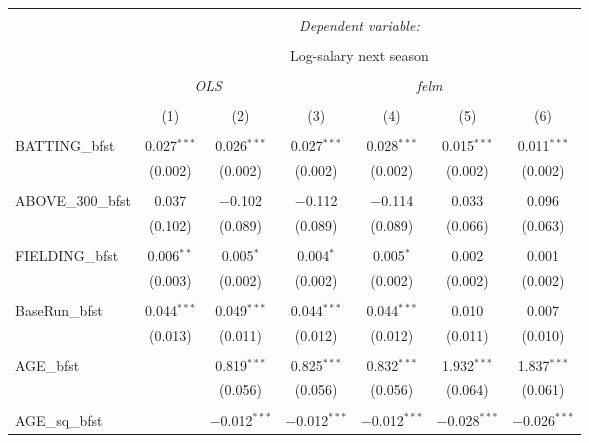 
\begin{table}[!htbp] \centering
  \caption{}
  \label{}
  \scriptsize 
\begin{tabular}{@{\extracolsep{5pt}}lcccccc}
\\[-1.8ex]\hline
\hline \\[-1.8ex]
 & \multicolumn{6}{c}{\textit{Dependent variable:}} \\
\cline{2-7}
\\[-1.8ex] & \multicolumn{6}{c}{Log-salary next season} \\
\\[-1.8ex] & \multicolumn{2}{c}{\textit{OLS}} & \multicolumn{4}{c}{\textit{felm}} \\
\\[-1.8ex] & (1) & (2) & (3) & (4) & (5) & (6)\\
\hline \\[-1.8ex]
 BATTING\_bfst & 0.027$^{***}$ & 0.026$^{***}$ & 0.027$^{***}$ & 0.028$^{***}$ & 0.015$^{***}$ & 0.011$^{***}$ \\
  & (0.002) & (0.002) & (0.002) & (0.002) & (0.002) & (0.002) \\
  & & & & & & \\
 ABOVE\_300\_bfst & 0.037 & $-$0.102 & $-$0.112 & $-$0.114 & 0.033 & 0.096 \\
  & (0.102) & (0.089) & (0.089) & (0.089) & (0.066) & (0.063) \\
  & & & & & & \\
 FIELDING\_bfst & 0.006$^{**}$ & 0.005$^{*}$ & 0.004$^{*}$ & 0.005$^{*}$ & 0.002 & 0.001 \\
  & (0.003) & (0.002) & (0.002) & (0.002) & (0.002) & (0.002) \\
  & & & & & & \\
 BaseRun\_bfst & 0.044$^{***}$ & 0.049$^{***}$ & 0.044$^{***}$ & 0.044$^{***}$ & 0.010 & 0.007 \\
  & (0.013) & (0.011) & (0.012) & (0.012) & (0.011) & (0.010) \\
  & & & & & & \\
 AGE\_bfst &  & 0.819$^{***}$ & 0.825$^{***}$ & 0.832$^{***}$ & 1.932$^{***}$ & 1.837$^{***}$ \\
  &  & (0.056) & (0.056) & (0.056) & (0.064) & (0.061) \\
  & & & & & & \\
 AGE\_sq\_bfst &  & $-$0.012$^{***}$ & $-$0.012$^{***}$ & $-$0.012$^{***}$ & $-$0.028$^{***}$ & $-$0.026$^{***}$ \\

\end{tabular}
\end{table}
